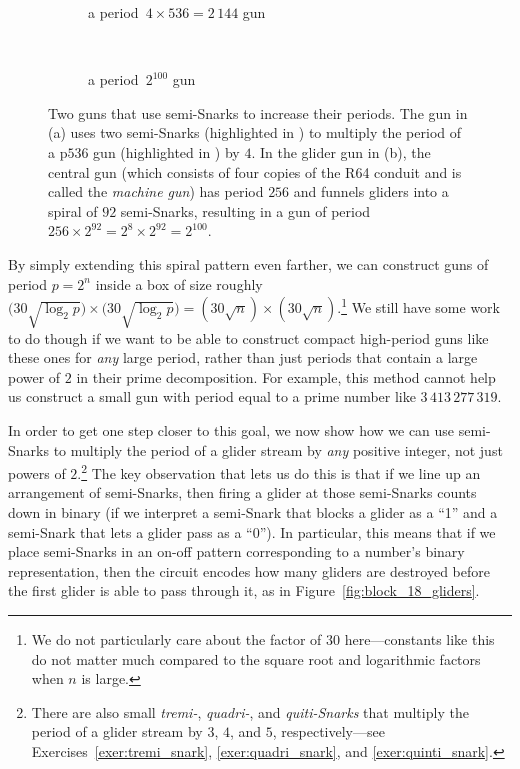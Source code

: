 \begin{figure}[!htb]
	\centering
	\begin{subfigure}{0.39\textwidth}
		\centering\vspace*{2.2cm}
		\caption{a period~$4 \times 536 = 2\, 144$ gun}
		\label{fig:p2144_gun}
	\end{subfigure} \ \ \ \ %
	\begin{subfigure}{0.57\textwidth}
		\centering
		\caption{a period~$2^{100}$ gun}
		\label{fig:p_2_100_gun}
	\end{subfigure}
	\caption{Two guns that use semi-Snarks to increase their periods. The gun in (a) uses two semi-Snarks (highlighted in ) to multiply the period of a p$536$ gun (highlighted in ) by $4$. In the glider gun in (b), the central gun (which consists of four copies of the R64 conduit and is called the \emph{machine gun}) has period $256$ and funnels gliders into a spiral of $92$ semi-Snarks, resulting in a gun of period $256 \times 2^{92} = 2^8 \times 2^{92} = 2^{100}$.}
	\label{fig:semi_snark_compact_guns}
\end{figure}

By simply extending this spiral pattern even farther, we can construct guns of period $p = 2^n$ inside a box of size roughly $\big(30\sqrt{\log_2{p}}\big) \times \big(30\sqrt{\log_2{p}}\big) = (30\sqrt{n}) \times (30\sqrt{n})$.\footnote{We do not particularly care about the factor of $30$ here---constants like this do not matter much compared to the square root and logarithmic factors when $n$ is large.} We still have some work to do though if we want to be able to construct compact high-period guns like these ones for \emph{any} large period, rather than just periods that contain a large power of $2$ in their prime decomposition. For example, this method cannot help us construct a small gun with period equal to a prime number like $3\, 413\, 277\, 319$.

In order to get one step closer to this goal, we now show how we can use semi-Snarks to multiply the period of a glider stream by \emph{any} positive integer, not just powers of $2$.\footnote{There are also small \emph{tremi-}, \emph{quadri-}, and \emph{quiti-Snarks} that multiply the period of a glider stream by $3$, $4$, and $5$, respectively---see Exercises~\ref{exer:tremi_snark}, \ref{exer:quadri_snark}, and \ref{exer:quinti_snark}.} The key observation that lets us do this is that if we line up an arrangement of semi-Snarks, then firing a glider at those semi-Snarks counts down in binary (if we interpret a semi-Snark that blocks a glider as a ``1'' and a semi-Snark that lets a glider pass as a ``0''). In particular, this means that if we place semi-Snarks in an on-off pattern corresponding to a number's binary representation, then the circuit encodes how many gliders are destroyed before the first glider is able to pass through it, as in Figure~\ref{fig:block_18_gliders}.

